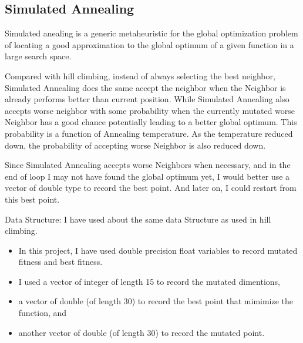 \documentclass{article}
\begin{document}
\begin{CJK}{UTF8}{gbsn}
\subsection{Simulated Annealing}
Simulated anealing is a generic metaheuristic for the global optimization problem of locating a good approximation to the global optimum of a given function in a large search space. 

Compared with hill climbing, instead of always selecting the best neighbor, Simulated Annealing does the same accept the neighbor when the Neighbor is already performs better than current position. While Simulated Annealing also accepts worse neighbor with some probability when the currently mutated worse Neighbor has a good chance potentially leading to a better global optimum. This probability is a function of Annealing temperature. As the temperature reduced down, the probability of accepting worse Neighbor is also reduced down.

Since Simulated Annealing accepts worse Neighbors when necessary, and in the end of loop I may not have found the global optimum yet, I would better use a vector of double type to record the best point. And later on, I could restart from this best point.  

\begin{description}
\item Data Structure: 
I have used about the same data Structure as used in hill climbing.
  \begin{itemize}
    \itemsep=-3pt
  \item In this project, I have used double precision float variables to record mutated fitness and best fitness. 
  \item I used a vector of integer of length 15 to record the mutated dimentions, 
  \item a vector of double (of length 30) to record the best point that mimimize the function, and
  \item another vector of double (of length 30) to record the mutated point. 
  \end{itemize}


\end{description}
\end{CJK}
\end{document}

